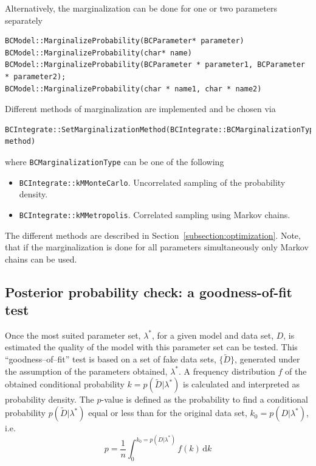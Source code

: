 \documentclass[11pt, a4paper]{article}
\begin{document}
\noindent 
Alternatively, the marginalization can be done for one or two
parameters separately
%
\begin{verbatim}
BCModel::MarginalizeProbability(BCParameter* parameter)
BCModel::MarginalizeProbability(char* name) 
BCModel::MarginalizeProbability(BCParameter * parameter1, BCParameter * parameter2);
BCModel::MarginalizeProbability(char * name1, char * name2)
\end{verbatim} 

\noindent 
Different methods of marginalization are implemented and be chosen via
%
\begin{verbatim}
BCIntegrate::SetMarginalizationMethod(BCIntegrate::BCMarginalizationType method)
\end{verbatim} 

\noindent
where \verb|BCMarginalizationType| can be one of the following 
% 
\begin{itemize}
\item \verb|BCIntegrate::kMMonteCarlo|. Uncorrelated sampling of the
 probability density.  
\item \verb|BCIntegrate::kMMetropolis|. Correlated sampling using
 Markov chains.
\end{itemize} 

\noindent 
The different methods are described in
Section~\ref{subsection:optimization}. Note, that if the
marginalization is done for all parameters simultaneously only Markov
chains can be used. \\


\subsection{Posterior probability check: a goodness-of-fit test} 

Once the most suited parameter set, $\lambda^{*}$, for a given model
and data set, $D$, is estimated the quality of the model with this
parameter set can be tested. This ``goodness--of--fit'' test is based
on a set of fake data sets, $\{ \tilde{D} \}$, generated under the
assumption of the parameters obtained, $\lambda^{*}$. A frequency
distribution $f$ of the obtained conditional probability
$k=p(\tilde{D}|\lambda^{*})$ is calculated and interpreted as
probability density. The $p$-value is defined as the probability to
find a conditional probability $p(\tilde{D}|\lambda^{*})$ equal or
less than for the original data set, $k_{0}=p(D|\lambda^{*})$, i.e.
%
\begin{equation}
p = \frac{1}{n} \int_{0}^{k_{0}=p(D|\lambda^{*})} f(k) \, \mathrm{d}k 
\end{equation} 
\end{document}
